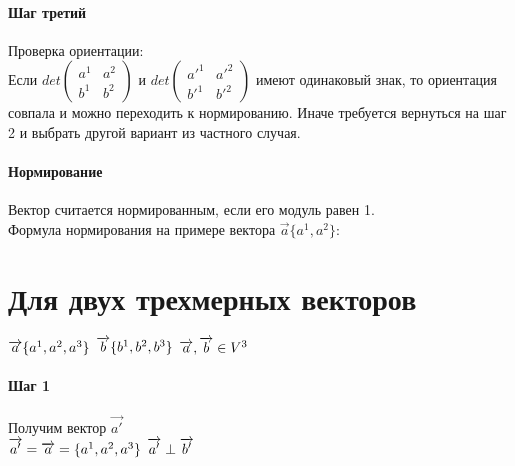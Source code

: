 \documentclass{book}
\begin{document}
\paragraph*{Шаг третий}
Проверка ориентации:\\
Если 
$det
    \begin{pmatrix}
        {a^1} & {a^2}\\
        {b^1} & {b^2}
    \end{pmatrix}
$ и $det
\begin{pmatrix}
    {a'^1} & {a'^2}\\
    {b'^1} & {b'^2}
\end{pmatrix}
$ имеют одинаковый знак, то ориентация совпала и можно переходить к нормированию. Иначе требуется вернуться на шаг 2 и выбрать другой вариант из частного случая.
\paragraph*{Нормирование}
Вектор считается нормированным, если его модуль равен 1.\\
Формула нормирования на примере вектора $\overrightarrow{a}\{a^1,a^2\}$:
\section{Для двух трехмерных векторов}
$\overrightarrow{a}\{a^1,a^2,a^3\}\\$
$\overrightarrow{b}\{b^1,b^2,b^3\}\\$
$\overrightarrow{a},\overrightarrow{b} \in V^3\\$
\paragraph*{Шаг 1}
Получим вектор $\overrightarrow{a'}$\\
$\overrightarrow{a'}=\overrightarrow{a}=\{a^1,a^2,a^3\}\\$
$\overrightarrow{a'}\perp\overrightarrow{b'}\\$
\end{document}
